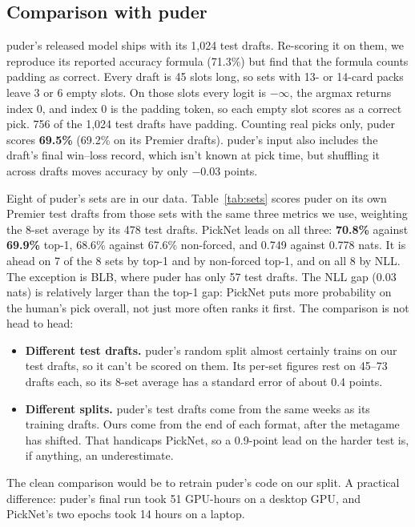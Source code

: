 \documentclass[10pt,letterpaper]{article}
\begin{document}
\subsection{Comparison with puder}\label{sec:puder}

puder's released model ships with its 1,024 test drafts. Re-scoring it on them, we reproduce its reported
accuracy formula (71.3\%) but find that the formula counts padding as correct. Every draft is 45 slots long,
so sets with 13- or 14-card packs leave 3 or 6 empty slots. On those slots every logit is $-\infty$, the
argmax returns index 0, and index 0 is the padding token, so each empty slot scores as a correct pick. 756
of the 1,024 test drafts have padding. Counting real picks only, puder scores \textbf{69.5\%} (69.2\% on its
Premier drafts). puder's input also includes the draft's final win--loss record, which isn't known at pick
time, but shuffling it across drafts moves accuracy by only $-$0.03 points.

Eight of puder's sets are in our data. Table~\ref{tab:sets} scores puder on its own Premier test drafts from
those sets with the same three metrics we use, weighting the 8-set average by its 478 test drafts. PickNet leads
on all three: \textbf{70.8\%} against \textbf{69.9\%} top-1, 68.6\% against 67.6\% non-forced, and 0.749 against 0.778
nats. It is ahead on 7 of the 8 sets by top-1 and by non-forced top-1, and on all 8 by NLL. The exception is BLB,
where puder has only 57 test drafts. The NLL gap (0.03 nats) is relatively larger than the top-1 gap: PickNet
puts more probability on the human's pick overall, not just more often ranks it first.
The comparison is not head to head:
\begin{itemize}
\item \textbf{Different test drafts.} puder's random split almost certainly trains on our test drafts, so it
can't be scored on them. Its per-set figures rest on 45--73 drafts each, so its 8-set average has a
standard error of about 0.4 points.
\item \textbf{Different splits.} puder's test drafts come from the same weeks as its training drafts. Ours come
from the end of each format, after the metagame has shifted. That handicaps PickNet, so a 0.9-point lead on
the harder test is, if anything, an underestimate.
\end{itemize}
The clean comparison would be to retrain puder's code on our split. A practical difference: puder's final
run took 51 GPU-hours on a desktop GPU, and PickNet's two epochs took 14 hours on a laptop.
\end{document}
